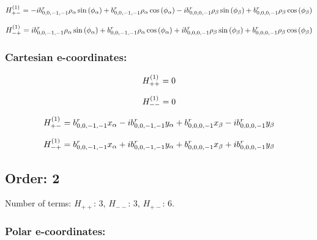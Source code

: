 \documentclass[fleqn]{article}
\begin{document}
\begin{dmath*}
H_{+-}^{(1)}=-  i b^{r}_{0,0,-1,-1} \rho_{\alpha} \sin{\left (\phi_{\alpha} \right )} + b^{r}_{0,0,-1,-1} \rho_{\alpha} \cos{\left (\phi_{\alpha} \right )} -  i b^{r}_{0,0,0,-1} \rho_{\beta} \sin{\left (\phi_{\beta} \right )} + b^{r}_{0,0,0,-1} \rho_{\beta} \cos{\left (\phi_{\beta} \right )}\\
\end{dmath*}

\begin{dmath*}
H_{-+}^{(1)}= i b^{r}_{0,0,-1,-1} \rho_{\alpha} \sin{\left (\phi_{\alpha} \right )} + b^{r}_{0,0,-1,-1} \rho_{\alpha} \cos{\left (\phi_{\alpha} \right )} +  i b^{r}_{0,0,0,-1} \rho_{\beta} \sin{\left (\phi_{\beta} \right )} + b^{r}_{0,0,0,-1} \rho_{\beta} \cos{\left (\phi_{\beta} \right )}\\
\end{dmath*}
\subsubsection*{Cartesian e-coordinates:}

\begin{dmath*}
H_{++}^{(1)}=0\\
\end{dmath*}

\begin{dmath*}
H_{--}^{(1)}=0\\
\end{dmath*}

\begin{dmath*}
H_{+-}^{(1)}=b^{r}_{0,0,-1,-1} x_{\alpha} -  i b^{r}_{0,0,-1,-1} y_{\alpha} + b^{r}_{0,0,0,-1} x_{\beta} -  i b^{r}_{0,0,0,-1} y_{\beta}\\
\end{dmath*}

\begin{dmath*}
H_{-+}^{(1)}=b^{r}_{0,0,-1,-1} x_{\alpha} +  i b^{r}_{0,0,-1,-1} y_{\alpha} + b^{r}_{0,0,0,-1} x_{\beta} +  i b^{r}_{0,0,0,-1} y_{\beta}\\
\end{dmath*}
\subsection{Order: 2}
Number of terms: $H_{++}$: $3$, $H_{--}$: $3$, $H_{+-}$: $6$.
\subsubsection*{Polar e-coordinates:}
\end{document}
